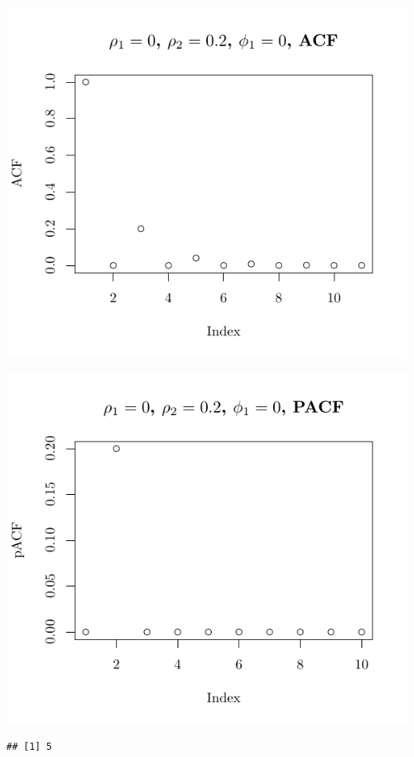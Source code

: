 \documentclass[10pt]{paper}\usepackage[]{graphicx}\usepackage[]{color}
\makeatletter
\def\maxwidth{ %
  \ifdim\Gin@nat@width>\linewidth
    \linewidth
  \else
    \Gin@nat@width
  \fi
}
\newenvironment{kframe}{%
 \def\at@end@of@kframe{}%
 \ifinner\ifhmode%
  \def\at@end@of@kframe{\end{minipage}}%
  \begin{minipage}{\columnwidth}%
 \fi\fi%
 \def\FrameCommand##1{\hskip\@totalleftmargin \hskip-\fboxsep
 \colorbox{shadecolor}{##1}\hskip-\fboxsep
     \hskip-\linewidth \hskip-\@totalleftmargin \hskip\columnwidth}%
 \MakeFramed {\advance\hsize-\width
   \@totalleftmargin\z@ \linewidth\hsize
   \@setminipage}}%
 {\par\unskip\endMakeFramed%
 \at@end@of@kframe}
\newenvironment{knitrout}{}{} %
\makeatother
\begin{document}
\begin{knitrout}
{\centering \includegraphics[width=\maxwidth]{figure/graphics-plotter-47} 

}




{\centering \includegraphics[width=\maxwidth]{figure/graphics-plotter-48} 

}


\begin{kframe}\begin{verbatim}
## [1] 5
\end{verbatim}
\end{kframe}


\end{knitrout}
\end{document}
